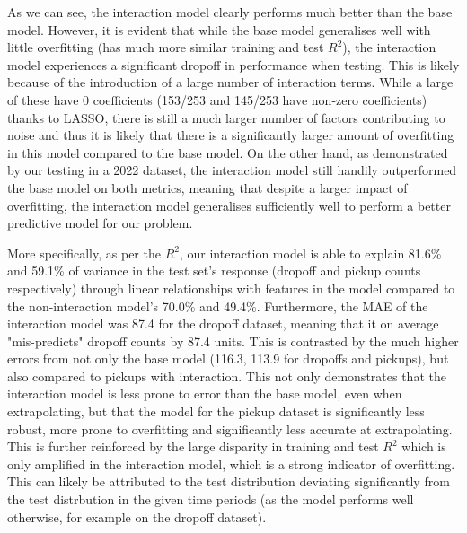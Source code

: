 \documentclass[11pt]{article}
\begin{document}
As we can see, the interaction model clearly performs much better than the base model. However, it is evident that while the base model generalises well with little overfitting (has much more similar training and test $R^2$), the interaction model experiences a significant dropoff in performance when testing. This is likely because of the introduction of a large number of interaction terms. While a large of these have 0 coefficients (153/253 and 145/253 have non-zero coefficients) thanks to LASSO, there is still a much larger number of factors contributing to noise and thus it is likely that there is a significantly larger amount of overfitting in this model compared to the base model. On the other hand, as demonstrated by our testing in a 2022 dataset, the interaction model still handily outperformed the base model on both metrics, meaning that despite a larger impact of overfitting, the interaction model generalises sufficiently well to perform a better predictive model for our problem. 

More specifically, as per the $R^2$, our interaction model is able to explain 81.6\% and 59.1\% of variance in the test set's response (dropoff and pickup counts respectively) through linear relationships with features in the model compared to the non-interaction model's 70.0\% and 49.4\%. Furthermore, the MAE of the interaction model was 87.4 for the dropoff dataset, meaning that it on average "mis-predicts" dropoff counts by 87.4 units. This is contrasted by the much higher errors from not only the base model (116.3, 113.9 for dropoffs and pickups), but also compared to pickups with interaction. This not only demonstrates that the interaction model is less prone to error than the base model, even when extrapolating, but that the model for the pickup dataset is significantly less robust, more prone to overfitting and significantly less accurate at extrapolating. This is further reinforced by the large disparity in training and test $R^2$ which is only amplified in the interaction model, which is a strong indicator of overfitting. This can likely be attributed to the test distribution deviating significantly from the test distrbution in the given time periods (as the model performs well otherwise, for example on the dropoff dataset). 
\end{document}

